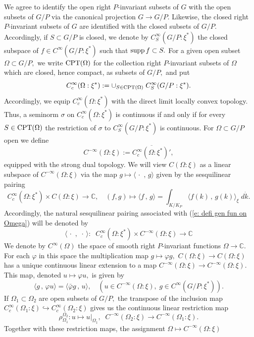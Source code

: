 \documentclass[12pt,a4paper]{article}
\def\msy#1{{\mathbb #1}}
\def\C{{\msy C}}
\def\gf{\varphi}
\def\gs{\sigma}
\def\to{\rightarrow}
\def\inp#1#2{\langle#1\,,\,#2\rangle}
\numberwithin{Thm}{section}
\numberwithin{equation}{section}
\def\supp{{\rm supp}}
\def\dotvar{\, \cdot\,}
\def\embeds{\hookrightarrow}
\numberwithin{equation}{section}
\def\CPT{{\rm CPT}}
\begin{document}
We agree to identify the open right $P$-invariant subsets of $G$ with the open subsets of $G/P$ 
via the canonical projection $G \to G/P.$ Likewise, the closed right $P$-invariant 
subsets of $G$ are identified with the closed subsets of $G/P.$ 
Accordingly, if $S\subset G/P$ is closed, we 
denote by 
$C^\infty_S(G/P:\xi^*)$ the closed subspace of $f \in C^\infty(G/P:\xi^*)$ such that  
$\supp \, f \subset S.$ For a given open subset $\Omega \subset G/P,$ we write
${\rm CPT}(\Omega)$ for the collection right $P$-invariant subsets of $\Omega$
which are closed, hence compact, as subsets of $G/P,$ 
and put 
$$ 
C_c^\infty(\Omega :\xi^*):= \cup_{S \in \CPT(\Omega)}  \;C_S^\infty (G/P:\xi^*).
$$ 
Accordingly, we equip $C_c^\infty(\Omega :\xi^*)$ with the direct limit locally convex topology.
Thus, a seminorm $\gs$ on $C_c^\infty(\Omega :\xi^*)$ is continuous if and only if 
for every $S\in \CPT(\Omega)$ the restriction of $\gs$ to $C_S^\infty(G/P:\xi^*)$
is continuous. 
For $\Omega \subset G/P$ open we define  
\begin{equation}
\label{e: defi gen fun on Omega}
C^{-\infty}(\Omega:\xi):= \overline{ C^\infty_c(\Omega:\xi^*)'},
\end{equation}
equipped with the strong dual topology. We will view $C(\Omega: \xi)$ as a linear subspace of  $ C^{-\infty}(\Omega: \xi)$ 
via the map $g\mapsto \inp{\dotvar}{g}$ given by the sesquilinear pairing
$$ 
C^\infty_c(\Omega:\xi^*) \times C(\Omega:\xi) \to \C, \quad (f,g)\mapsto \inp{f}{g} = \int_{K/K_P} \inp{f(k)}{g(k)}_\xi \; d\dot{k}.
$$
Accordingly, the natural sesquilinear pairing associated with (\ref{e: defi gen fun on Omega}) will be denoted by 
$$ 
\inp{\dotvar}{\dotvar}: \;\; C_c^{\infty}(\Omega:\xi^*) \times C^{-\infty}(\Omega:\xi) \to \C
$$ 
We denote by $C^\infty(\Omega)$ the space of smooth right $P$-invariant functions
$\Omega \to \C.$ 
For each $\gf$ in this space the multiplication map $g\mapsto \gf g,$ $C(\Omega:\xi) \to C(\Omega: \xi)$ has a unique continuous linear extension to a map $C^{-\infty}(\Omega:\xi) \to C^{-\infty }(\Omega: \xi).$ This map, denoted $u \mapsto \gf u,$  is given by 
$$ 
\inp{g}{\gf u} = \inp{\bar \gf  g}{u} , \quad (u \in C^{-\infty}(\Omega:\xi), \;g \in C^\infty(G/P:\xi^*)).
$$ 
If $\Omega_1\subset \Omega_2$ are open 
subsets of $G/P,$ the transpose of the inclusion map $C^\infty_c(\Omega_1:\xi) \embeds C^\infty_c(\Omega_2:\xi)$ gives us the continuous linear restriction map
$$ 
\rho^{\Omega_2}_{\Omega_1}: u \mapsto u|_{\Omega_1},\;\; C^{-\infty}(\Omega_2:\xi)\to C^{-\infty}(\Omega_1:\xi).
$$ 
Together with these restriction maps, the assignment $\Omega \mapsto C^{-\infty}(\Omega:\xi)$ 
\end{document}
